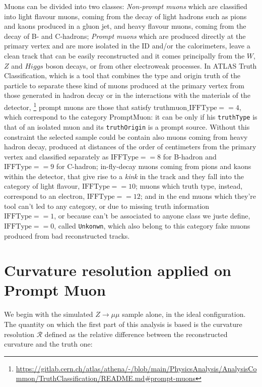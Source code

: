 \documentclass[11pt,a4paper,twoside,openright]{report}
\begin{document}
Muons can be divided into two classes: \emph{Non-prompt muons} which are classified into light flavour muons, coming from the decay of light hadrons such as pions and kaons produced in a gluon jet, and heavy flavour muons, coming from the decay of B- and C-hadrons; \emph{Prompt muons} which are produced directly at the primary vertex and are more isolated in the ID and/or the calorimeters, leave a clean track that can be easily reconstructed and it comes principally from the \(W\), \(Z\) and \(Higgs\) boson decays, or from other electroweak processes. In ATLAS Truth Classification, which is a tool that combines the type and origin truth of the particle to separate these kind of  muons produced at the primary vertex from those generated in hadron decay or in the interactions with the materials of the detector, \footnote{\url{https://gitlab.cern.ch/atlas/athena/-/blob/main/PhysicsAnalysis/AnalysisCommon/TruthClassification/README.md\#prompt-muons}} prompt muons are those that satisfy \(\text{truthmuon\_IFFType} == 4\), which correspond to the category PromptMuon: it can be only if his \texttt{truthType} is that of an isolated muon and its \texttt{truthOrigin} is a prompt source. Without this constraint the selected sample could be contain also muons coming from heavy hadron decay, produced at distances of the order of centimeters from the primary vertex and classified separately as \(\text{IFFType} == 8\) for B-hadron and \(\text{IFFType} == 9\)  for C-hadron; in-fly-decay muons coming from pions and kaons within the detector, that give rise to a \emph{kink} in the track and they fall into the category of light flavour, \(\text{IFFType} == 10\); muons which truth type, instead, correspond to an electron, \(\text{IFFType} == 12\); and in the end muons which they're tool can't led to any category, or due to missing truth information \(\text{IFFType} == 1\), or because can't be associated to anyone class we juste define, \(\text{IFFType} == 0\), called \texttt{Unkonwn}, which also belong to this category fake muons produced from bad reconstructed tracks.

\section{Curvature resolution applied on Prompt Muon}

We begin with the simulated $Z\rightarrow\mu\mu$ sample alone, in the ideal configuration. The quantity on which the first part of this analysis is based is the curvature resolution $\mathcal{R}$ defined as the relative difference between the reconstructed curvature and the truth one:
\end{document}
